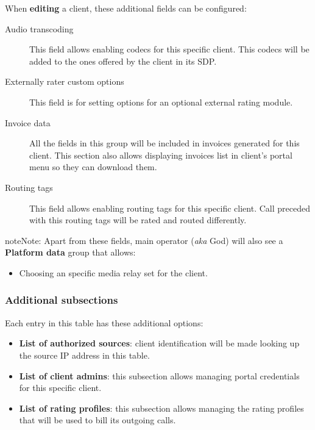 \documentclass[letterpaper,10pt,english]{sphinxmanual}
\begin{document}
When \textbf{editing} a client, these additional fields can be configured:
\begin{description}
\item[{Audio transcoding}] \leavevmode{}\label{administration_portal/brand/clients/wholesale:term-audio-transcoding}
This field allows enabling codecs for this specific client. This codecs will be added to
the ones offered by the client in its SDP.

\item[{Externally rater custom options}] \leavevmode{}\label{administration_portal/brand/clients/wholesale:term-externally-rater-custom-options}
This field is for setting options for an optional external rating module.

\item[{Invoice data}] \leavevmode{}\label{administration_portal/brand/clients/wholesale:term-invoice-data}
All the fields in this group will be included in invoices generated for this client. This section also allows
displaying invoices list in client's portal menu so they can download them.

\item[{Routing tags}] \leavevmode{}\label{administration_portal/brand/clients/wholesale:term-routing-tags}
This field allows enabling routing tags for this specific client. Call preceded with this
routing tags will be rated and routed differently.

\end{description}

\begin{notice}{note}{Note:}
Apart from these fields, main operator (\emph{aka} God) will also see a \textbf{Platform data} group that allows:
\begin{itemize}
\item {} 
Choosing an specific media relay set for the client.

\end{itemize}
\end{notice}


\subsubsection{Additional subsections}
\label{administration_portal/brand/clients/wholesale:additional-subsections}
Each entry in this table has these additional options:
\begin{itemize}
\item {} 
\textbf{List of authorized sources}: client identification will be made looking up the source IP address in this table.

\item {} 
\textbf{List of client admins}: this subsection allows managing portal credentials for this specific client.

\item {} 
\textbf{List of rating profiles}: this subsection allows managing the rating profiles that will be used to bill its outgoing calls.

\end{itemize}
\end{document}
